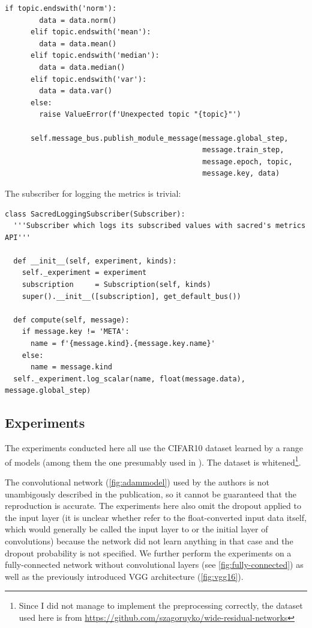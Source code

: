 \begin{lstlisting}[label={lst:running_moments_sub},
caption={Subscriber to record Adam terms}]
      if topic.endswith('norm'):
        data = data.norm()
      elif topic.endswith('mean'):
        data = data.mean()
      elif topic.endswith('median'):
        data = data.median()
      elif topic.endswith('var'):
        data = data.var()
      else:
        raise ValueError(f'Unexpected topic "{topic}"')

      self.message_bus.publish_module_message(message.global_step,
                                              message.train_step,
                                              message.epoch, topic,
                                              message.key, data)
\end{lstlisting}

The subscriber for logging the metrics is trivial:
\begin{lstlisting}
class SacredLoggingSubscriber(Subscriber):
  '''Subscriber which logs its subscribed values with sacred's metrics API'''

  def __init__(self, experiment, kinds):
    self._experiment = experiment
    subscription     = Subscription(self, kinds)
    super().__init__([subscription], get_default_bus())

  def compute(self, message):
    if message.key != 'META':
      name = f'{message.kind}.{message.key.name}'
    else:
      name = message.kind
  self._experiment.log_scalar(name, float(message.data), message.global_step)
\end{lstlisting}


\subsection{Experiments}%
\label{sub:experiments}

The experiments conducted here all use the CIFAR10 dataset learned by a range of
models (among them the one presumably used in \citet{kingma2014adam}). The
dataset is whitened\footnote{Since I did not manage to implement the
preprocessing correctly, the dataset used here is from
\url{https://github.com/szagoruyko/wide-residual-networks}}.

The convolutional network (\cref{fig:adammodel}) used by the authors is not unambigously described in
the publication, so it cannot be guaranteed that the reproduction is accurate.
The experiments here also omit the dropout applied to the input layer (it is
unclear whether \citeauthor{kingma2014adam} refer to the float-converted input
data itself, which would generally be called the input layer to or the initial
layer of convolutions) because the network did not learn anything in that case
and the dropout probability is not specified. We further perform the experiments
on a fully-connected network without convolutional layers (see
\cref{fig:fully-connected}) as well as the previously introduced VGG
architecture (\cref{fig:vgg16}).

